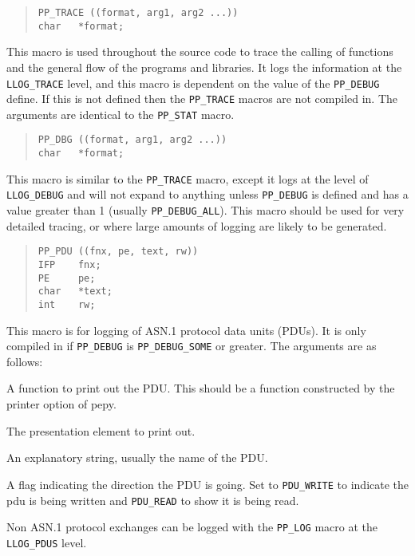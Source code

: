 \begin{quote}\begin{verbatim}
PP_TRACE ((format, arg1, arg2 ...))
char   *format;
\end{verbatim}\end{quote}
This macro is used throughout the source code to trace the calling of
functions and the general flow of the programs and libraries. It logs
the information at the \verb|LLOG_TRACE| level, and this macro is
dependent on the value of the \verb|PP_DEBUG| define. If this is not
defined then the \verb|PP_TRACE| macros are not compiled in.
The arguments are identical to the \verb|PP_STAT| macro.

\begin{quote}\begin{verbatim}
PP_DBG ((format, arg1, arg2 ...))
char   *format;
\end{verbatim}\end{quote}
This macro is similar to the \verb|PP_TRACE| macro, except it logs at
the level of
\linebreak
\verb|LLOG_DEBUG| and will not expand to anything unless
\verb|PP_DEBUG| is defined and has a value greater than 1 (usually
\verb+PP_DEBUG_ALL+). This macro
should be used for very detailed tracing, or where large amounts of
logging are likely to be generated.

\begin{quote}\begin{verbatim}
PP_PDU ((fnx, pe, text, rw))
IFP    fnx;
PE     pe;
char   *text;
int    rw;
\end{verbatim}\end{quote}
This macro is for logging of ASN.1 protocol data units (PDUs).
It is only compiled in if \verb|PP_DEBUG| is
\verb+PP_DEBUG_SOME+ or greater. The arguments
are as follows:
\begin{describe}
\item[\verb|fnx|:]	A function to print out the PDU. This should
be a function constructed by the printer option of pepy.

\item[\verb|pe|:]	The presentation element to print out.

\item[\verb|str|:]	An explanatory string, usually the name of
the PDU.

\item[\verb|rw|:]	A flag indicating the direction the PDU is
going. Set to \verb|PDU_WRITE| to indicate the pdu is being 
written and \verb|PDU_READ| to show it is being read.
\end{describe}
Non ASN.1 protocol exchanges can be logged with the
\verb|PP_LOG| macro at the 
\linebreak
\verb|LLOG_PDUS| level.

